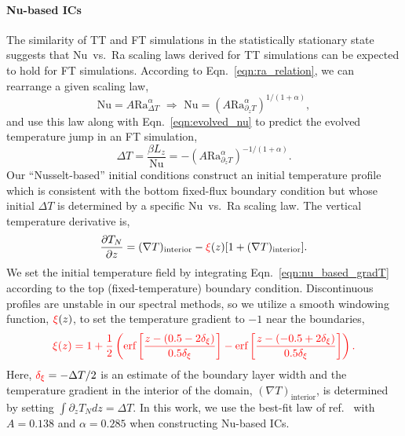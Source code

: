 \documentclass[aps, pre, onecolumn, nofootinbib, notitlepage, groupedaddress, amsfonts, amssymb, amsmath, longbibliography, superscriptaddress]{revtex4-1}
\newcommand{\grad}{\ensuremath{\nabla}}
\newcommand{\ea}[1]{{\color{red} #1}}
\begin{document}
\paragraph{Nu-based ICs} 
The similarity of TT and FT simulations in the statistically stationary state suggests that Nu~vs.~Ra scaling laws derived for TT simulations can be expected to hold for FT simulations.
According to Eqn.~\ref{eqn:ra_relation}, we can rearrange a given scaling law,
\begin{equation}
\text{Nu} = A \text{Ra}_{\Delta T}^{\alpha} \,\,\Rightarrow\,\, \text{Nu} = (A \text{Ra}_{\partial_z T}^{\alpha})^{1/(1+\alpha)},
\end{equation}
and use this law along with Eqn.~\ref{eqn:evolved_nu} to predict the evolved temperature jump in an FT simulation,
\begin{equation}
\Delta T = \frac{\beta L_z}{\text{Nu}} = -(A \text{Ra}_{\partial_z T}^{\alpha})^{-1/(1+\alpha)}.
\end{equation}
Our ``Nusselt-based'' initial conditions construct an initial temperature profile which is consistent with the bottom fixed-flux boundary condition but whose initial $\Delta T$ is determined by a specific Nu~vs.~Ra scaling law.
The vertical temperature derivative is,
\begin{equation}
\frac{\partial T_N}{\partial z} = (\grad T)_{\text{interior}} - \ea{\xi}(z)[1 + (\grad T)_{\text{interior}}].
\label{eqn:nu_based_gradT}
\end{equation}
We set the initial temperature field by integrating Eqn.~\ref{eqn:nu_based_gradT} according to the top (fixed-temperature) boundary condition.
Discontinuous profiles are unstable in our spectral methods, so we utilize a smooth windowing function, $\ea{\xi}(z)$, to set the temperature gradient to $-1$ near the boundaries,
\begin{equation}
\ea{
\xi(z) = 1 + \frac{1}{2}\left(\text{erf}\left[\frac{z - (0.5 - 2\delta_\xi)}{0.5\delta_\xi}\right] - \text{erf}\left[\frac{z - (-0.5 + 2\delta_\xi)}{0.5\delta_\xi}\right]\right).
}
\end{equation}
Here, $\ea{\delta_\xi} = -\Delta T / 2$ is an estimate of the boundary layer width and the temperature gradient in the interior of the domain, $(\grad T)_{\text{interior}}$, is determined by setting $\int \partial_z T_N dz = \Delta T$.
In this work, we use the best-fit law of ref.~\cite{johnston&doering2009} with $A = 0.138$ and $\alpha = 0.285$ when constructing Nu-based ICs.
\end{document}
